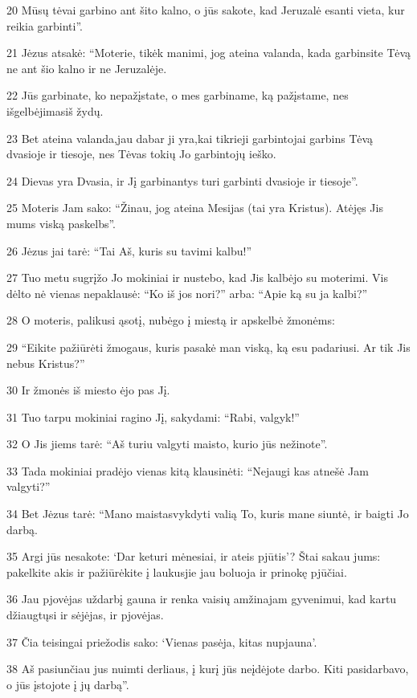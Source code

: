 \par 20 Mūsų tėvai garbino ant šito kalno, o jūs sakote, kad Jeruzalė esanti vieta, kur reikia garbinti”. 
\par 21 Jėzus atsakė: “Moterie, tikėk manimi, jog ateina valanda, kada garbinsite Tėvą ne ant šio kalno ir ne Jeruzalėje. 
\par 22 Jūs garbinate, ko nepažįstate, o mes garbiname, ką pažįstame, nes išgelbėjimas­iš žydų. 
\par 23 Bet ateina valanda,­jau dabar ji yra,­kai tikrieji garbintojai garbins Tėvą dvasioje ir tiesoje, nes Tėvas tokių Jo garbintojų ieško. 
\par 24 Dievas yra Dvasia, ir Jį garbinantys turi garbinti dvasioje ir tiesoje”. 
\par 25 Moteris Jam sako: “Žinau, jog ateina Mesijas (tai yra Kristus). Atėjęs Jis mums viską paskelbs”. 
\par 26 Jėzus jai tarė: “Tai Aš, kuris su tavimi kalbu!” 
\par 27 Tuo metu sugrįžo Jo mokiniai ir nustebo, kad Jis kalbėjo su moterimi. Vis dėlto nė vienas nepaklausė: “Ko iš jos nori?” arba: “Apie ką su ja kalbi?” 
\par 28 O moteris, palikusi ąsotį, nubėgo į miestą ir apskelbė žmonėms: 
\par 29 “Eikite pažiūrėti žmogaus, kuris pasakė man viską, ką esu padariusi. Ar tik Jis nebus Kristus?” 
\par 30 Ir žmonės iš miesto ėjo pas Jį. 
\par 31 Tuo tarpu mokiniai ragino Jį, sakydami: “Rabi, valgyk!” 
\par 32 O Jis jiems tarė: “Aš turiu valgyti maisto, kurio jūs nežinote”. 
\par 33 Tada mokiniai pradėjo vienas kitą klausinėti: “Nejaugi kas atnešė Jam valgyti?” 
\par 34 Bet Jėzus tarė: “Mano maistas­vykdyti valią To, kuris mane siuntė, ir baigti Jo darbą. 
\par 35 Argi jūs nesakote: ‘Dar keturi mėnesiai, ir ateis pjūtis’? Štai sakau jums: pakelkite akis ir pažiūrėkite į laukus­jie jau boluoja ir prinokę pjūčiai. 
\par 36 Jau pjovėjas uždarbį gauna ir renka vaisių amžinajam gyvenimui, kad kartu džiaugtųsi ir sėjėjas, ir pjovėjas. 
\par 37 Čia teisingai priežodis sako: ‘Vienas pasėja, kitas nupjauna’. 
\par 38 Aš pasiunčiau jus nuimti derliaus, į kurį jūs neįdėjote darbo. Kiti pasidarbavo, o jūs įstojote į jų darbą”. 
